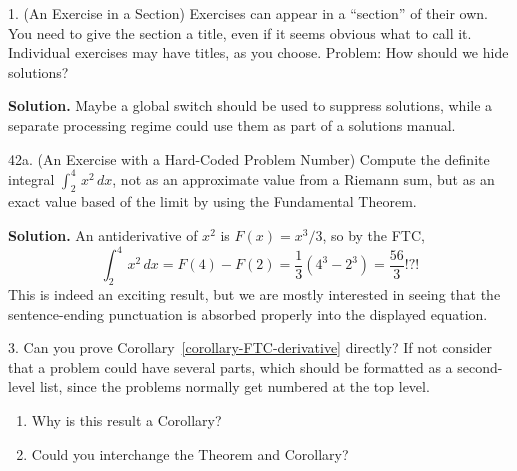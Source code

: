 \documentclass[10pt,]{article}
\theoremstyle{plain}
\theoremstyle{definition}
\theoremstyle{definition}
\theoremstyle{definition}
\theoremstyle{definition}
\theoremstyle{definition}
\theoremstyle{definition}
\numberwithin{equation}{section}
\newcommand{\definiteintegral}[4]{\int_{#1}^{#2}\,#3\,d#4}
\begin{document}
\begin{exerciselist}
\item[1.]\hypertarget{exercise-20}{}(An Exercise in a Section)\space\space{}\hypertarget{p-506}{}%
Exercises can appear in a ``section'' of their own.  You need to give the section a title, even if it seems obvious what to call it.  Individual exercises may have titles, as you choose.  Problem: How should we hide solutions?%
\par\smallskip
\par\smallskip%
\noindent\textbf{Solution.}\hypertarget{solution-10}{}\quad%
\hypertarget{p-507}{}%
Maybe a global switch should be used to suppress solutions, while a separate processing regime could use them as part of a solutions manual.%
\item[42a.]\hypertarget{exercise-with-hardcoded-number}{}(An Exercise with a Hard-Coded Problem Number)\space\space{}\hypertarget{p-508}{}%
Compute the definite integral \(\definiteintegral{2}{4}{x^2}{x}\), not as an approximate value from a Riemann sum, but as an exact value based of the limit by using the Fundamental Theorem.%
\par\smallskip
\par\smallskip%
\noindent\textbf{Solution.}\hypertarget{solution-antiderivative}{}\quad%
\hypertarget{p-509}{}%
An antiderivative of \(x^2\) is \(F(x)=x^3/3\), so by the FTC,%
\begin{equation*}
\definiteintegral{2}{4}{x^2}{x}=F(4)-F(2)=\frac{1}{3}\left(4^3-2^3\right)=\frac{56}{3}\text{!?!}
\end{equation*}
This is indeed an exciting result, but we are mostly interested in seeing that the sentence-ending punctuation is absorbed properly into the displayed equation.%
\item[3.]\hypertarget{exercise-22}{}\hypertarget{p-510}{}%
Can you prove Corollary~\hyperref[corollary-FTC-derivative]{\ref{corollary-FTC-derivative}} directly?  If not consider that a problem could have several parts, which should be formatted as a second-level list, since the problems normally get numbered at the top level.\leavevmode%
\begin{enumerate}[label=(\alph*)]
\item\hypertarget{li-160}{}\hypertarget{p-511}{}%
Why is this result a Corollary?%
\item\hypertarget{li-161}{}\hypertarget{p-512}{}%
Could you interchange the Theorem and Corollary?%
\end{enumerate}
%
\par\smallskip

\end{exerciselist}
\end{document}
